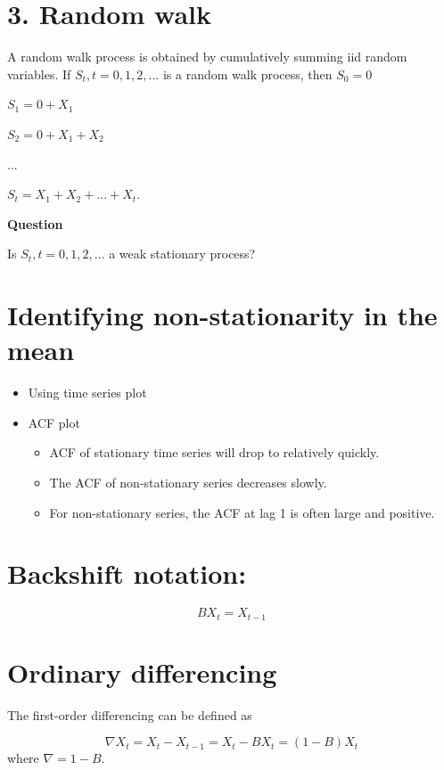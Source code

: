 \documentclass[
  11pt,
  a4paper,
]{report}
\begin{document}
\section{3. Random walk}\label{random-walk}

A random walk process is obtained by cumulatively summing iid random
variables. If \({S_t, t=0, 1, 2, ...}\) is a random walk process, then
\(S_0 =0\)

\(S_1=0+X_1\)

\(S_2=0+X_1+X_2\)

\(...\)

\(S_t=X_1+X_2+...+X_t.\)

\textbf{Question}

Is \({S_t, t=0, 1, 2, ...}\) a weak stationary process?

\section{Identifying non-stationarity in the
mean}\label{identifying-non-stationarity-in-the-mean}

\begin{itemize}
\item
  Using time series plot
\item
  ACF plot

  \begin{itemize}
  \item
    ACF of stationary time series will drop to relatively quickly.
  \item
    The ACF of non-stationary series decreases slowly.
  \item
    For non-stationary series, the ACF at lag 1 is often large and
    positive.
  \end{itemize}
\end{itemize}

\section{Backshift notation:}\label{backshift-notation}

\[BX_t=X_{t-1}\]

\section{Ordinary differencing}\label{ordinary-differencing}

The first-order differencing can be defined as

\[\nabla X_t = X_t-X_{t-1}=X_t-BX_t=(1-B)X_t\] where \(\nabla=1-B\).
\end{document}
